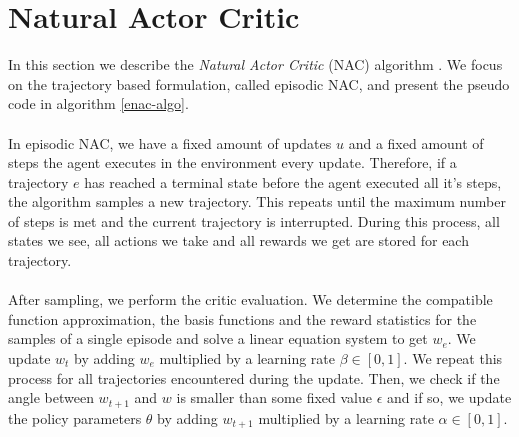
\newpage
\section{Natural Actor Critic}
In this section we describe the \textit{Natural Actor Critic} (NAC) algorithm \citep{peters2005natural}. We focus on the trajectory based formulation, called episodic NAC, and present the pseudo code in algorithm \ref{enac-algo}.
\\\\
In episodic NAC, we have a fixed amount of updates $u$ and a fixed amount of steps the agent executes in the environment every update. Therefore, if a trajectory $e$ has reached a terminal state before the agent executed all it's steps, the algorithm samples a new trajectory. This repeats until the maximum number of steps is met and the current trajectory is interrupted. During this process, all states we see, all actions we take and all rewards we get are stored for each trajectory.
\\\\
After sampling, we perform the critic evaluation. We determine the compatible function approximation, the basis functions and the reward statistics for the samples of a single episode and solve a linear equation system to get $w_e$. We update $w_t$ by adding $w_e$ multiplied by a learning rate $\beta \in [0,1]$. We repeat this process for all trajectories encountered during the update. Then, we check if the angle between $w_{t+1}$ and $w$ is smaller than some fixed value $\epsilon$ and if so, we update the policy parameters $\theta$ by adding $w_{t+1}$ multiplied by a learning rate $\alpha \in [0,1]$.

